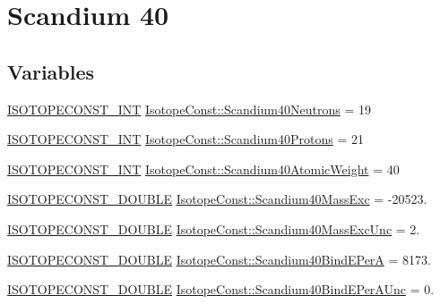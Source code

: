 \hypertarget{group___isotope_const-_scandium-_sc40}{}\section{Scandium 40}
\label{group___isotope_const-_scandium-_sc40}
\subsection*{Variables}
\begin{DoxyCompactItemize}
\item 
\mbox{\hyperlink{group___isotope_const-_macros_ga5f18360b3e99483a35c32d789e62621c}{I\+S\+O\+T\+O\+P\+E\+C\+O\+N\+S\+T\+\_\+\+I\+NT}} \mbox{\hyperlink{group___isotope_const-_scandium-_sc40_gad27f936326d1a9effa6ad2a732387209}{Isotope\+Const\+::\+Scandium40\+Neutrons}} = 19
\item 
\mbox{\hyperlink{group___isotope_const-_macros_ga5f18360b3e99483a35c32d789e62621c}{I\+S\+O\+T\+O\+P\+E\+C\+O\+N\+S\+T\+\_\+\+I\+NT}} \mbox{\hyperlink{group___isotope_const-_scandium-_sc40_ga12fba7a371774145c959f03ad496cc22}{Isotope\+Const\+::\+Scandium40\+Protons}} = 21
\item 
\mbox{\hyperlink{group___isotope_const-_macros_ga5f18360b3e99483a35c32d789e62621c}{I\+S\+O\+T\+O\+P\+E\+C\+O\+N\+S\+T\+\_\+\+I\+NT}} \mbox{\hyperlink{group___isotope_const-_scandium-_sc40_ga13f6c17bfdcdc43cb1f3f0ed70a4fe5d}{Isotope\+Const\+::\+Scandium40\+Atomic\+Weight}} = 40
\item 
\mbox{\hyperlink{group___isotope_const-_macros_ga8f45a7272ce02c0b4c65c44636ed719a}{I\+S\+O\+T\+O\+P\+E\+C\+O\+N\+S\+T\+\_\+\+D\+O\+U\+B\+LE}} \mbox{\hyperlink{group___isotope_const-_scandium-_sc40_ga17b8d48cb785e585bd1f3237d5314db3}{Isotope\+Const\+::\+Scandium40\+Mass\+Exc}} = -\/20523.
\item 
\mbox{\hyperlink{group___isotope_const-_macros_ga8f45a7272ce02c0b4c65c44636ed719a}{I\+S\+O\+T\+O\+P\+E\+C\+O\+N\+S\+T\+\_\+\+D\+O\+U\+B\+LE}} \mbox{\hyperlink{group___isotope_const-_scandium-_sc40_ga6e32f542a3cf621c9a105d6308ffb95a}{Isotope\+Const\+::\+Scandium40\+Mass\+Exc\+Unc}} = 2.
\item 
\mbox{\hyperlink{group___isotope_const-_macros_ga8f45a7272ce02c0b4c65c44636ed719a}{I\+S\+O\+T\+O\+P\+E\+C\+O\+N\+S\+T\+\_\+\+D\+O\+U\+B\+LE}} \mbox{\hyperlink{group___isotope_const-_scandium-_sc40_ga39f4392b4b17590ea707370132e30479}{Isotope\+Const\+::\+Scandium40\+Bind\+E\+PerA}} = 8173.
\item 
\mbox{\hyperlink{group___isotope_const-_macros_ga8f45a7272ce02c0b4c65c44636ed719a}{I\+S\+O\+T\+O\+P\+E\+C\+O\+N\+S\+T\+\_\+\+D\+O\+U\+B\+LE}} \mbox{\hyperlink{group___isotope_const-_scandium-_sc40_ga1b501922017b44e3698e9bab6631ce20}{Isotope\+Const\+::\+Scandium40\+Bind\+E\+Per\+A\+Unc}} = 0.

\end{DoxyCompactItemize}
